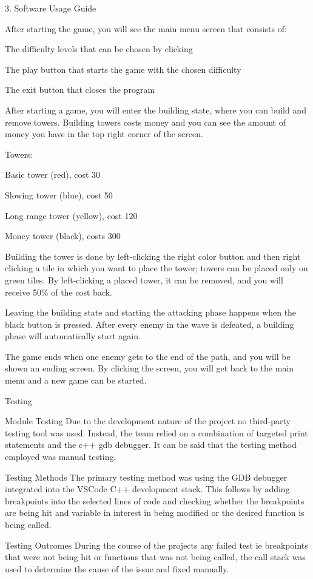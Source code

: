 3. Software Usage Guide

After starting the game, you will see the main menu screen that consists of\+:

The difficulty levels that can be chosen by clicking

The play button that starts the game with the chosen difficulty

The exit button that closes the program

After starting a game, you will enter the building state, where you can build and remove towers. Building towers costs money and you can see the amount of money you have in the top right corner of the screen.

Towers\+:

Basic tower (red), cost 30

Slowing tower (blue), cost 50

Long range tower (yellow), cost 120

Money tower (black), costs 300

Building the tower is done by left-\/clicking the right color button and then right clicking a tile in which you want to place the tower; towers can be placed only on green tiles. By left-\/clicking a placed tower, it can be removed, and you will receive 50\% of the cost back.

Leaving the building state and starting the attacking phase happens when the black button is pressed. After every enemy in the wave is defeated, a building phase will automatically start again.

The game ends when one enemy gets to the end of the path, and you will be shown an ending screen. By clicking the screen, you will get back to the main menu and a new game can be started.

Testing

Module Testing Due to the development nature of the project no third-\/party testing tool was used. Instead, the team relied on a combination of targeted print statements and the c++ gdb debugger. It can be said that the testing method employed was manual testing.

Testing Methods The primary testing method was using the GDB debugger integrated into the VSCode C++ development stack. This follows by adding breakpoints into the selected lines of code and checking whether the breakpoints are being hit and variable in interest in being modified or the desired function is being called.

Testing Outcomes During the course of the projects any failed test ie breakpoints that were not being hit or functions that was not being called, the call stack was used to determine the cause of the issue and fixed manually.

